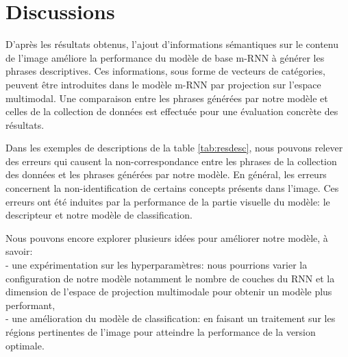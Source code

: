 \pagestyle{fancy}

\renewcommand{\footrulewidth}{1pt}

\fancyhead[L]{\footnotesize \rightmark}
\fancyhead[C]{\thepage}

\fancyfoot[C]{\thepage}


\chapter{Discussions} \label{discussion}

D'après les résultats obtenus, l'ajout d'informations sémantiques sur le contenu de l'image améliore la performance du modèle de base m-RNN à générer les phrases descriptives. Ces informations, sous forme de vecteurs de catégories, peuvent être introduites dans le modèle m-RNN par projection sur l'espace multimodal. 
Une comparaison entre les phrases générées par notre modèle  et celles de la collection de données est effectuée pour une évaluation concrète des résultats.

Dans les exemples de descriptions de la table \ref{tab:resdesc}, nous pouvons relever des erreurs qui causent la non-correspondance entre les phrases de la collection des données et les phrases générées par notre modèle. En général, les erreurs concernent la non-identification de certains concepts présents dans l'image. Ces erreurs ont été induites par la performance de la partie visuelle du modèle: le descripteur et notre modèle de classification. 

Nous pouvons encore explorer plusieurs idées pour améliorer notre modèle, à savoir: \\
- une expérimentation sur les hyperparamètres: nous pourrions varier la configuration de notre modèle notamment le nombre de couches du RNN et la dimension de l'espace de projection multimodale pour obtenir un modèle plus performant,\\
- une amélioration du modèle de classification: en faisant un traitement sur les régions pertinentes de l'image pour atteindre la performance de la version optimale.

